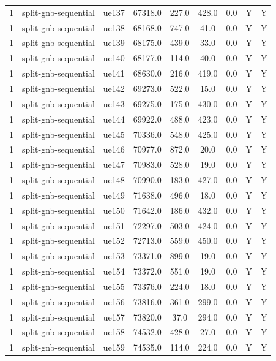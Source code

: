 \begin{table}[ht]
\begin{tabular}{|c|c|c|c|c|c|c|c|c|}
1 & split-gnb-sequential & ue137 & 67318.0 & 227.0 & 428.0 & 0.0 & Y & Y \\
1 & split-gnb-sequential & ue138 & 68168.0 & 747.0 & 41.0 & 0.0 & Y & Y \\
1 & split-gnb-sequential & ue139 & 68175.0 & 439.0 & 33.0 & 0.0 & Y & Y \\
1 & split-gnb-sequential & ue140 & 68177.0 & 114.0 & 40.0 & 0.0 & Y & Y \\
1 & split-gnb-sequential & ue141 & 68630.0 & 216.0 & 419.0 & 0.0 & Y & Y \\
1 & split-gnb-sequential & ue142 & 69273.0 & 522.0 & 15.0 & 0.0 & Y & Y \\
1 & split-gnb-sequential & ue143 & 69275.0 & 175.0 & 430.0 & 0.0 & Y & Y \\
1 & split-gnb-sequential & ue144 & 69922.0 & 488.0 & 423.0 & 0.0 & Y & Y \\
1 & split-gnb-sequential & ue145 & 70336.0 & 548.0 & 425.0 & 0.0 & Y & Y \\
1 & split-gnb-sequential & ue146 & 70977.0 & 872.0 & 20.0 & 0.0 & Y & Y \\
1 & split-gnb-sequential & ue147 & 70983.0 & 528.0 & 19.0 & 0.0 & Y & Y \\
1 & split-gnb-sequential & ue148 & 70990.0 & 183.0 & 427.0 & 0.0 & Y & Y \\
1 & split-gnb-sequential & ue149 & 71638.0 & 496.0 & 18.0 & 0.0 & Y & Y \\
1 & split-gnb-sequential & ue150 & 71642.0 & 186.0 & 432.0 & 0.0 & Y & Y \\
1 & split-gnb-sequential & ue151 & 72297.0 & 503.0 & 424.0 & 0.0 & Y & Y \\
1 & split-gnb-sequential & ue152 & 72713.0 & 559.0 & 450.0 & 0.0 & Y & Y \\
1 & split-gnb-sequential & ue153 & 73371.0 & 899.0 & 19.0 & 0.0 & Y & Y \\
1 & split-gnb-sequential & ue154 & 73372.0 & 551.0 & 19.0 & 0.0 & Y & Y \\
1 & split-gnb-sequential & ue155 & 73376.0 & 224.0 & 18.0 & 0.0 & Y & Y \\
1 & split-gnb-sequential & ue156 & 73816.0 & 361.0 & 299.0 & 0.0 & Y & Y \\
1 & split-gnb-sequential & ue157 & 73820.0 & 37.0 & 294.0 & 0.0 & Y & Y \\
1 & split-gnb-sequential & ue158 & 74532.0 & 428.0 & 27.0 & 0.0 & Y & Y \\
1 & split-gnb-sequential & ue159 & 74535.0 & 114.0 & 224.0 & 0.0 & Y & Y \\

\end{tabular}
\end{table}
